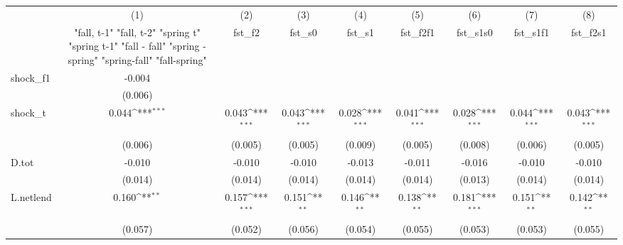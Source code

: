 {
\def\sym#1{\ifmmode^{#1}\else\(^{#1}\)\fi}
\begin{tabular}{l*{8}{c}}
\toprule
            &\multicolumn{1}{c}{(1)}&\multicolumn{1}{c}{(2)}&\multicolumn{1}{c}{(3)}&\multicolumn{1}{c}{(4)}&\multicolumn{1}{c}{(5)}&\multicolumn{1}{c}{(6)}&\multicolumn{1}{c}{(7)}&\multicolumn{1}{c}{(8)}\\
            &\multicolumn{1}{c}{  "fall, t-1" "fall, t-2" "spring t" "spring t-1"  "fall - fall" "spring - spring" "spring-fall" "fall-spring" }&\multicolumn{1}{c}{fst\_f2}&\multicolumn{1}{c}{fst\_s0}&\multicolumn{1}{c}{fst\_s1}&\multicolumn{1}{c}{fst\_f2f1}&\multicolumn{1}{c}{fst\_s1s0}&\multicolumn{1}{c}{fst\_s1f1}&\multicolumn{1}{c}{fst\_f2s1}\\
\midrule
shock\_f1    &      -0.004         &                     &                     &                     &                     &                     &                     &                     \\
            &     (0.006)         &                     &                     &                     &                     &                     &                     &                     \\
\addlinespace
shock\_t     &       0.044\sym{***}&       0.043\sym{***}&       0.043\sym{***}&       0.028\sym{***}&       0.041\sym{***}&       0.028\sym{***}&       0.044\sym{***}&       0.043\sym{***}\\
            &     (0.006)         &     (0.005)         &     (0.005)         &     (0.009)         &     (0.005)         &     (0.008)         &     (0.006)         &     (0.005)         \\
\addlinespace
D.tot       &      -0.010         &      -0.010         &      -0.010         &      -0.013         &      -0.011         &      -0.016         &      -0.010         &      -0.010         \\
            &     (0.014)         &     (0.014)         &     (0.014)         &     (0.014)         &     (0.014)         &     (0.013)         &     (0.014)         &     (0.014)         \\
\addlinespace
L.netlend   &       0.160\sym{**} &       0.157\sym{***}&       0.151\sym{**} &       0.146\sym{**} &       0.138\sym{**} &       0.181\sym{***}&       0.151\sym{**} &       0.142\sym{**} \\
            &     (0.057)         &     (0.052)         &     (0.056)         &     (0.054)         &     (0.055)         &     (0.053)         &     (0.053)         &     (0.055)         \\

\end{tabular}}
